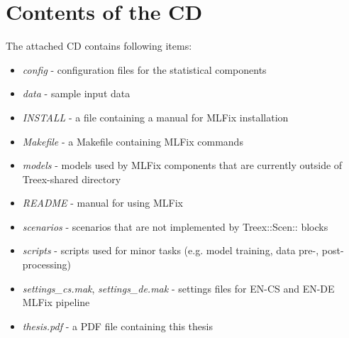 \chapter{Contents of the CD}
\label{attach:cd}

The attached CD contains following items:

\begin{itemize}
\item
    \emph{config} - configuration files for the statistical components
\item
    \emph{data} - sample input data
\item
    \emph{INSTALL} - a file containing a manual for MLFix installation
\item
    \emph{Makefile} - a Makefile containing MLFix commands
\item
    \emph{models} - models used by MLFix components that are currently outside of Treex-shared directory
\item
    \emph{README} - manual for using MLFix
\item
	\emph{scenarios} - scenarios that are not implemented by Treex::Scen:: blocks
\item
	\emph{scripts} - scripts used for minor tasks (e.g. model training, data pre-, post-processing)
\item
	\emph{settings\_cs.mak}, \emph{settings\_de.mak} - settings files for EN-CS and EN-DE MLFix pipeline
\item
	\emph{thesis.pdf} - a PDF file containing this thesis
\end{itemize}
